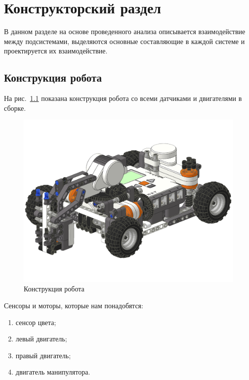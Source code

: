 \chapter{Конструкторский раздел}
\label{cha:design}

В данном разделе на основе проведенного анализа описывается взаимодействие между подсистемами, выделяются основные составляющие в каждой системе и проектируется их взаимодействие.

\section{Конструкция робота}

На рис.~\ref{fig:figconstruct} показана конструкция робота со всеми датчиками и двигателями в сборке.

\begin{figure}[ht!]
  \centering
  \includegraphics[width=\textwidth]{inc/raster/robot-construct.png}
  \caption{Конструкция робота}
  \label{fig:figconstruct}
\end{figure}

Сенсоры и моторы, которые нам понадобятся:

\begin{enumerate}
  \item сенсор цвета;
  \item левый двигатель;
  \item правый двигатель;
  \item двигатель манипулятора.
\end{enumerate}


